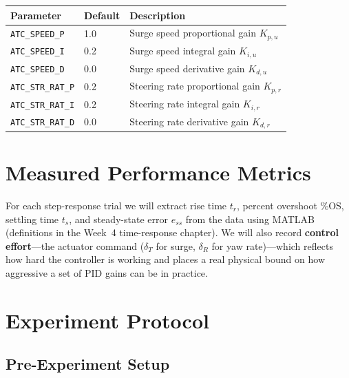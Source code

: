\documentclass[../../book.tex]{subfiles}
\begin{document}
\vspace{6pt}
\begin{center}
\begin{tabular}{L{4.0cm} C{2.0cm} L{6.2cm}}
  \textbf{Parameter} & \textbf{Default} & \textbf{Description} \\
  \midrule
  \texttt{ATC\_SPEED\_P}       & 1.0 & Surge speed proportional gain $K_{p,u}$ \\[2pt]
  \texttt{ATC\_SPEED\_I}       & 0.2 & Surge speed integral gain $K_{i,u}$ \\[2pt]
  \texttt{ATC\_SPEED\_D}       & 0.0 & Surge speed derivative gain $K_{d,u}$ \\[6pt]
  \texttt{ATC\_STR\_RAT\_P}    & 0.2 & Steering rate proportional gain $K_{p,r}$ \\[2pt]
  \texttt{ATC\_STR\_RAT\_I}    & 0.2 & Steering rate integral gain $K_{i,r}$ \\[2pt]
  \texttt{ATC\_STR\_RAT\_D}    & 0.0 & Steering rate derivative gain $K_{d,r}$ \\[4pt]
  \bottomrule
\end{tabular}
\end{center}
\vspace{6pt}

\section{Measured Performance Metrics}

For each step-response trial we will extract rise time $t_r$, percent overshoot \%OS, settling time $t_s$, and steady-state error $e_{ss}$ from the data using MATLAB (definitions in the Week~4 time-response chapter).  We will also record \textbf{control effort}---the actuator command ($\delta_T$ for surge, $\delta_R$ for yaw rate)---which reflects how hard the controller is working and places a real physical bound on how aggressive a set of PID gains can be in practice.

\section{Experiment Protocol}
\label{sec:protocol}

\subsection{Pre-Experiment Setup}
\end{document}
